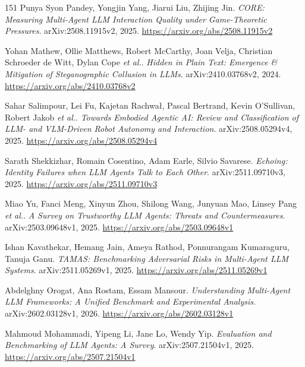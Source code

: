 \documentclass[11pt,a4paper]{article}
\begin{document}
\begin{thebibliography}{151}
Punya Syon Pandey, Yongjin Yang, Jiarui Liu, Zhijing Jin.
\newblock \emph{CORE: Measuring Multi-Agent LLM Interaction Quality under Game-Theoretic Pressures}.
\newblock arXiv:2508.11915v2, 2025.
\newblock \url{https://arxiv.org/abs/2508.11915v2}

Yohan Mathew, Ollie Matthews, Robert McCarthy, Joan Velja, Christian Schroeder de Witt, Dylan Cope \emph{et al.}.
\newblock \emph{Hidden in Plain Text: Emergence \& Mitigation of Steganographic Collusion in LLMs}.
\newblock arXiv:2410.03768v2, 2024.
\newblock \url{https://arxiv.org/abs/2410.03768v2}

Sahar Salimpour, Lei Fu, Kajetan Rachwa\l{}, Pascal Bertrand, Kevin O'Sullivan, Robert Jakob \emph{et al.}.
\newblock \emph{Towards Embodied Agentic AI: Review and Classification of LLM- and VLM-Driven Robot Autonomy and Interaction}.
\newblock arXiv:2508.05294v4, 2025.
\newblock \url{https://arxiv.org/abs/2508.05294v4}

Sarath Shekkizhar, Romain Cosentino, Adam Earle, Silvio Savarese.
\newblock \emph{Echoing: Identity Failures when LLM Agents Talk to Each Other}.
\newblock arXiv:2511.09710v3, 2025.
\newblock \url{https://arxiv.org/abs/2511.09710v3}

Miao Yu, Fanci Meng, Xinyun Zhou, Shilong Wang, Junyuan Mao, Linsey Pang \emph{et al.}.
\newblock \emph{A Survey on Trustworthy LLM Agents: Threats and Countermeasures}.
\newblock arXiv:2503.09648v1, 2025.
\newblock \url{https://arxiv.org/abs/2503.09648v1}

Ishan Kavathekar, Hemang Jain, Ameya Rathod, Ponnurangam Kumaraguru, Tanuja Ganu.
\newblock \emph{TAMAS: Benchmarking Adversarial Risks in Multi-Agent LLM Systems}.
\newblock arXiv:2511.05269v1, 2025.
\newblock \url{https://arxiv.org/abs/2511.05269v1}

Abdelghny Orogat, Ana Rostam, Essam Mansour.
\newblock \emph{Understanding Multi-Agent LLM Frameworks: A Unified Benchmark and Experimental Analysis}.
\newblock arXiv:2602.03128v1, 2026.
\newblock \url{https://arxiv.org/abs/2602.03128v1}

Mahmoud Mohammadi, Yipeng Li, Jane Lo, Wendy Yip.
\newblock \emph{Evaluation and Benchmarking of LLM Agents: A Survey}.
\newblock arXiv:2507.21504v1, 2025.
\newblock \url{https://arxiv.org/abs/2507.21504v1}


\end{thebibliography}
\end{document}
